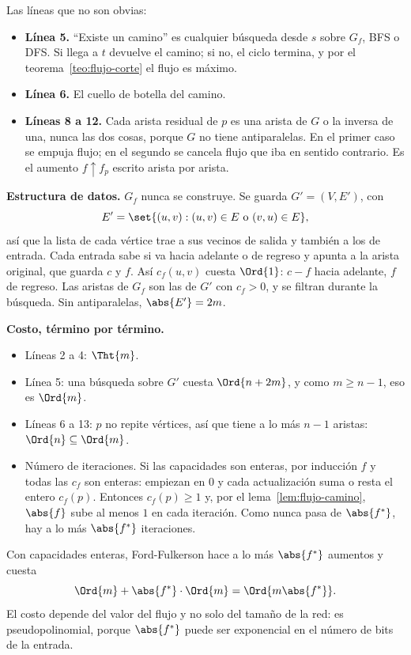 \documentclass[11pt,letterpaper]{article}
\begin{document}
Las líneas que no son obvias:
\begin{itemize}[beginpenalty=10000]
  \item \textbf{Línea 5.} ``Existe un camino'' es cualquier búsqueda
        desde $s$ sobre $G_f$, BFS o DFS. Si llega a $t$ devuelve el
        camino; si no, el ciclo termina, y por el
        teorema~\ref{teo:flujo-corte} el flujo es máximo.
  \item \textbf{Línea 6.} El cuello de botella del camino.
  \item \textbf{Líneas 8 a 12.} Cada arista residual de $p$ es una
        arista de $G$ o la inversa de una, nunca las dos cosas, porque
        $G$ no tiene antiparalelas. En el primer caso se empuja flujo;
        en el segundo se cancela flujo que iba en sentido contrario.
        Es el aumento $f \uparrow f_p$ escrito arista por arista.
\end{itemize}

\textbf{Estructura de datos.} $G_f$ nunca se construye. Se guarda
$G' = (V, E')$, con
\[
  E' = \set{(u, v) : (u, v) \in E \text{ o } (v, u) \in E} ,
\]
así que la lista de cada vértice trae a sus vecinos de salida y
también a los de entrada. Cada entrada sabe si va hacia adelante o
de regreso y apunta a la arista original, que guarda $c$ y $f$. Así
$c_f(u, v)$ cuesta $\Ord{1}$: $c - f$ hacia adelante, $f$ de regreso.
Las aristas de $G_f$ son las de $G'$ con $c_f > 0$, y se filtran
durante la búsqueda. Sin antiparalelas, $\abs{E'} = 2m$.

\textbf{Costo, término por término.}
\begin{itemize}[beginpenalty=10000]
  \item Líneas 2 a 4: $\Tht{m}$.
  \item Línea 5: una búsqueda sobre $G'$ cuesta $\Ord{n + 2m}$, y
        como $m \ge n - 1$, eso es $\Ord{m}$.
  \item Líneas 6 a 13: $p$ no repite vértices, así que tiene a lo más
        $n - 1$ aristas: $\Ord{n} \subseteq \Ord{m}$.
  \item Número de iteraciones. Si las capacidades son enteras, por
        inducción $f$ y todas las $c_f$ son enteras: empiezan en $0$ y
        cada actualización suma o resta el entero $c_f(p)$. Entonces
        $c_f(p) \ge 1$ y, por el lema~\ref{lem:flujo-camino},
        $\abs{f}$ sube al menos $1$ en cada iteración. Como nunca pasa
        de $\abs{f^*}$, hay a lo más $\abs{f^*}$ iteraciones.
\end{itemize}

\begin{resultado}
  Con capacidades enteras, Ford-Fulkerson hace a lo más $\abs{f^*}$
  aumentos y cuesta
  \[
    \Ord{m} + \abs{f^*} \cdot \Ord{m} = \Ord{m \abs{f^*}} .
  \]
  El costo depende del valor del flujo y no solo del tamaño de la red:
  es pseudopolinomial, porque $\abs{f^*}$ puede ser exponencial en el
  número de bits de la entrada.
\end{resultado}
\end{document}
